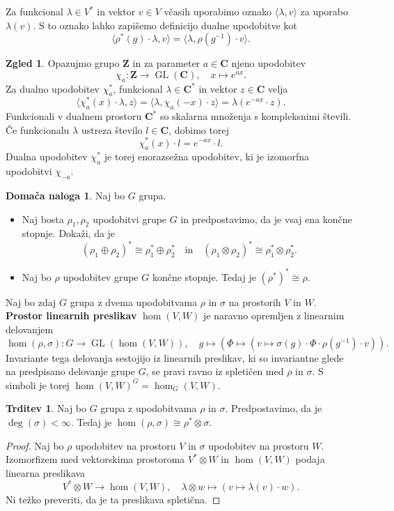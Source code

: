 \documentclass[11pt]{book}
\def\ZZ{\mathbf{Z}}
\def\CC{\mathbf{C}}
\DeclareMathOperator\GL{GL}
\def\definicija{\color{rdeca}\bf}
\theoremstyle{definition}
\theoremstyle{zgled}
\newtheorem{zgled}[theorem]{Zgled}
\theoremstyle{zgledbrezstevilke}
\theoremstyle{odprtproblem}
\theoremstyle{domacanaloga}
\newtheorem{domacanaloga}[theorem]{Domača naloga}
\newenvironment{dokaz}
    {\color{siva}\begin{proof}}
    {\end{proof}}
\theoremstyle{izrek}
\newtheorem{trditev}[theorem]{Trditev}
\begin{document}
Za funkcional $\lambda \in V^*$ in vektor $v \in V$ včasih uporabimo oznako $\langle \lambda, v \rangle$ za uporabo $\lambda(v)$. S to oznako lahko zapišemo definicijo dualne upodobitve kot
\[
    \langle \rho^*(g) \cdot \lambda, v \rangle = \langle \lambda, \rho(g^{-1}) \cdot v \rangle.
\]

\begin{zgled}
Opazujmo grupo $\ZZ$ in za parameter $a \in \CC$ njeno upodobitev
\[
    \chi_a \colon \ZZ \to \GL(\CC), \quad
    x \mapsto e^{ax}.
\]
Za dualno upodobitev $\chi_a^*$, funkcional $\lambda \in \CC^*$ in vektor $z \in \CC$ velja
\[
    \langle \chi_a^*(x) \cdot \lambda, z \rangle = 
    \langle \lambda, \chi_a(-x) \cdot z \rangle =
    \lambda(e^{-ax} \cdot z).
\]
Funkcionali v dualnem prostoru $\CC^*$ so skalarna množenja s kompleksnimi števili. Če funkcionalu $\lambda$ ustreza število $l \in \CC$, dobimo torej
\[
    \chi_a^*(x) \cdot l = e^{-ax} \cdot l.
\]
Dualna upodobitev $\chi_a^*$ je torej enorazsežna upodobitev, ki je izomorfna upodobitvi $\chi_{-a}$.
\end{zgled}

\begin{domacanaloga} 
Naj bo $G$ grupa.
\begin{itemize}
    \item Naj bosta $\rho_1, \rho_2$ upodobitvi grupe $G$ in predpostavimo, da je vsaj ena končne stopnje. Dokaži, da je
    \[
        \left( \rho_1 \oplus \rho_2 \right)^* \cong \rho_1^* \oplus \rho_2^*
        \quad \text{in} \quad
        \left( \rho_1 \otimes \rho_2 \right)^* \cong \rho_1^* \otimes \rho_2^*.
        \]
    \item Naj bo $\rho$ upodobitev grupe $G$ končne stopnje. Tedaj je $\left( \rho^* \right)^* \cong \rho$. 
\end{itemize}
\end{domacanaloga}

Naj bo zdaj $G$ grupa z dvema upodobitvama $\rho$ in $\sigma$ na prostorih $V$ in $W$. {\definicija Prostor linearnih preslikav} $\hom(V,W)$ je naravno opremljen z linearnim delovanjem
\[
    \hom(\rho, \sigma) \colon G \to \GL(\hom(V,W)), \quad
    g \mapsto \left( \Phi \mapsto \left( v \mapsto \sigma(g) \cdot \Phi \cdot \rho(g^{-1}) \cdot v \right) \right).
\]
Invariante tega delovanja sestojijo iz linearnih preslikav, ki so invariantne glede na predpisano delovanje grupe $G$, se pravi ravno iz spletičen med $\rho$ in $\sigma$. S simboli je torej $\hom(V,W)^G = \hom_G(V,W)$.

\begin{trditev}
Naj bo $G$ grupa z upodobitvama $\rho$ in $\sigma$. Predpostavimo, da je $\deg(\sigma) < \infty$. Tedaj je $\hom(\rho, \sigma) \cong \rho^* \otimes \sigma$.
\end{trditev}
\begin{dokaz}
Naj bo $\rho$ upodobitev na prostoru $V$ in $\sigma$ upodobitev na prostoru $W$. Izomorfizem med vektorskima prostoroma $V^* \otimes W$ in $\hom(V,W)$ podaja linearna preslikava
\[
    V^* \otimes W \to \hom(V,W), \quad
    \lambda \otimes w \mapsto \left( v \mapsto \lambda(v) \cdot w \right).
\]
Ni težko preveriti, da je ta preslikava spletična.
\end{dokaz}
\end{document}
